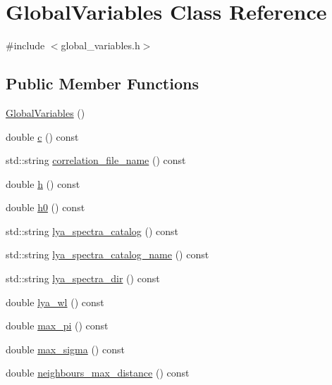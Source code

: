 \hypertarget{class_global_variables}{\section{Global\-Variables Class Reference}
\label{class_global_variables}
}


{\ttfamily \#include $<$global\-\_\-variables.\-h$>$}

\subsection*{Public Member Functions}
\begin{DoxyCompactItemize}
\item 
\hyperlink{class_global_variables_a4631d1ecf5fe11e440926a3464028eb0}{Global\-Variables} ()
\item 
double \hyperlink{class_global_variables_aa30e576f3563c41b63177a5ae93b9aab}{c} () const 
\item 
std\-::string \hyperlink{class_global_variables_ab8932c7446ddcc1bbf9f19d07ec44424}{correlation\-\_\-file\-\_\-name} () const 
\item 
double \hyperlink{class_global_variables_ab5102be8fa70c050ab20349e47fa388d}{h} () const 
\item 
double \hyperlink{class_global_variables_a1ae6b307005b7da0849b79173ab5b62d}{h0} () const 
\item 
std\-::string \hyperlink{class_global_variables_a7b251a0da7026b671d8a68279cab4ae7}{lya\-\_\-spectra\-\_\-catalog} () const 
\item 
std\-::string \hyperlink{class_global_variables_a7ef593cd3a148af75812f2e8479595ae}{lya\-\_\-spectra\-\_\-catalog\-\_\-name} () const 
\item 
std\-::string \hyperlink{class_global_variables_ac337ea3586fbb1346240ad25c696f6f0}{lya\-\_\-spectra\-\_\-dir} () const 
\item 
double \hyperlink{class_global_variables_a2893eb2c29a895d604ac471c320f4a39}{lya\-\_\-wl} () const 
\item 
double \hyperlink{class_global_variables_ae3688afd60bb03fd4e788d27af1ac8fe}{max\-\_\-pi} () const 
\item 
double \hyperlink{class_global_variables_a13694704b2bb849bae0d46e577246fb0}{max\-\_\-sigma} () const 
\item 
double \hyperlink{class_global_variables_aae93df7713a9e59706c8d8cd03e62a8a}{neighbours\-\_\-max\-\_\-distance} () const 
\item 

\end{DoxyCompactItemize}
